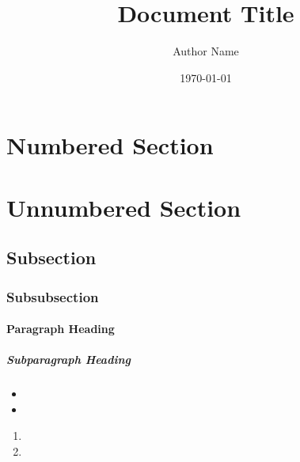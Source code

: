\documentclass{labreport}
\title{Document Title}
\author{Author Name}
\date{\today}
\begin{document}
\maketitle

\tableofcontents

\begin{abstract}
    \lipsum[1][1-3]
\end{abstract}

\section{Numbered Section}
\section*{Unnumbered Section}
\subsection{Subsection}
\subsubsection{Subsubsection}
\paragraph{Paragraph Heading} \lipsum[1][1-3]
\subparagraph{Subparagraph Heading} \lipsum[1][1-3]

\textit{\lipsum[1][1]}

\textbf{\lipsum[1][1]}

\underline{\lipsum[1][1]}

\begin{itemize}
    \item \lipsum[1][1]
    \item \lipsum[1][1]
\end{itemize}

\begin{enumerate}
    \item \lipsum[1][1]
    \item \lipsum[1][1]
\end{enumerate}

\begin{quote}
    \lipsum[1][1-3]
\end{quote}

\begin{quotation}
    \lipsum[1][1-3]
    
    \lipsum[1][1-3]
\end{quotation}
\end{document}
